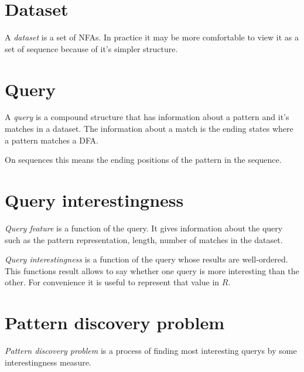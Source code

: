 \section{Dataset}

A \emph{dataset} is a set of NFAs. In practice it may be more comfortable
to view it as a set of sequence because of it's simpler structure.

\section{Query}

A \emph{query} is a compound structure that has information about a
pattern and it's matches in a dataset. The information about a
match is the ending states where a pattern matches a DFA.

On sequences this means the ending positions of the pattern 
in the sequence.

\section{Query interestingness}

\emph{Query feature} is a function of the query. It gives 
information about the query such as the pattern representation, 
length, number of matches in the dataset.

\emph{Query interestingness} is a function of the query whose
results are well-ordered. This functions result allows to
say whether one query is more interesting than the other.
For convenience it is useful to represent that value in
$R$.

\section{Pattern discovery problem}

\emph{Pattern discovery problem} is a process of finding
most interesting querys by some interestingness measure.


